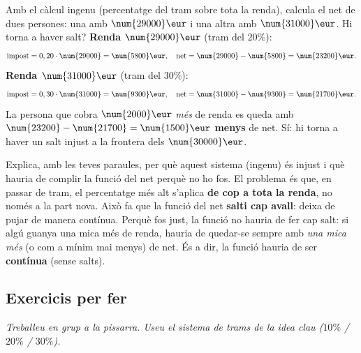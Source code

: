 \begin{exresolt}
Amb el càlcul ingenu (percentatge del tram sobre tota la renda), calcula el net de
dues persones: una amb $\num{29000}\eur$ i una altra amb $\num{31000}\eur$. Hi torna
a haver salt?
\solucio
\textbf{Renda $\num{29000}\eur$} (tram del $20\%$):
\[
\text{impost}=0,20\cdot\num{29000}=\num{5800}\eur,\quad
\text{net}=\num{29000}-\num{5800}=\num{23200}\eur.
\]
\textbf{Renda $\num{31000}\eur$} (tram del $30\%$):
\[
\text{impost}=0,30\cdot\num{31000}=\num{9300}\eur,\quad
\text{net}=\num{31000}-\num{9300}=\num{21700}\eur.
\]
La persona que cobra $\num{2000}\eur$ \emph{més} de renda es queda amb
$\num{23200}-\num{21700}=\num{1500}\eur$ \textbf{menys} de net. Sí: hi torna a haver
un salt injust a la frontera dels $\num{30000}\eur$.
\end{exresolt}

\begin{exresolt}
Explica, amb les teves paraules, per què aquest sistema (ingenu) és injust i què
hauria de complir la funció del net perquè no ho fos.
\solucio
El problema és que, en passar de tram, el percentatge més alt s'aplica
\textbf{de cop a tota la renda}, no només a la part nova. Això fa que la funció del
net \textbf{salti cap avall}: deixa de pujar de manera contínua. Perquè fos just,
la funció no hauria de fer cap salt: si algú guanya una mica més de renda, hauria de
quedar-se sempre amb \emph{una mica més} (o com a mínim mai menys) de net. És a dir,
la funció hauria de ser \textbf{contínua} (sense salts).
\end{exresolt}

\subsection{Exercicis per fer}

\noindent\textit{Treballeu en grup a la pissarra. Useu el sistema de trams de la idea
clau ($10\%$ / $20\%$ / $30\%$).}

